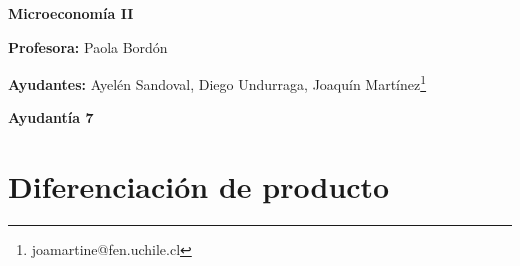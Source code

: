 \documentclass{exam}
\renewcommand{\thefootnote}{\fnsymbol{footnote}}
\begin{document}
\begin{center}

\LARGE{\textbf{Microeconomía II}}

\medskip
\normalsize \textbf{Profesora:} Paola Bordón

\normalsize \textbf{Ayudantes:} Ayelén Sandoval, Diego Undurraga, Joaquín Martínez\footnote[2]{joamartine@fen.uchile.cl}


\medskip
\large{\textbf{Ayudantía 7}}

\end{center}

\tableofcontents

\renewcommand{\thefootnote}{\Roman{footnote}}

\section{Diferenciación de producto}
\end{document}
